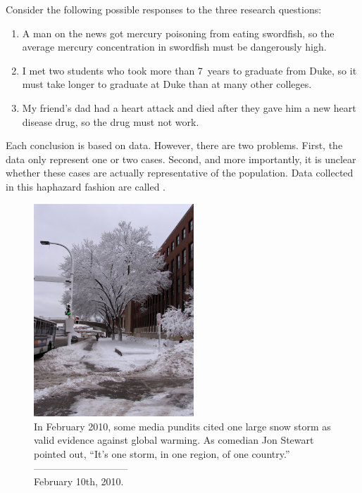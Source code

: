 Consider the following possible responses to the three research questions:
\begin{enumerate}
\item A man on the news got mercury poisoning from eating swordfish, so the average mercury concentration in swordfish must be dangerously high.
\item\label{iKnowThreeStudentsWhoTookMoreThan7YearsToGraduateAtDuke} I met two students who took more than 7~years to graduate from Duke, so it must take longer to graduate at Duke than at many other colleges.
\item\label{myFriendsDadDiedAfterSulphinpyrazon} My friend's dad had a heart attack and died after they gave him a new heart disease drug, so the drug must not work.
\end{enumerate}
Each conclusion is based on data. However, there are two problems. First, the data only represent one or two cases. Second, and more importantly, it is unclear whether these cases are actually representative of the population. Data collected in this haphazard fashion are called .

\setlength{\captionwidth}{\textwidth-80mm}
\begin{figure}
\centering
\hspace{8mm}\includegraphics[width=60mm]{ch_data_collection/figures/mnWinter/mnWinter}\hspace{4mm}
\begin{minipage}[b]{\textwidth - 80mm}
   \caption[anecdotal evidence]{In February 2010, some media pundits cited one large snow storm as valid evidence against global warming. As comedian Jon Stewart pointed out, ``It's one storm, in one region, of one country.''\vspace{-4.5mm} \\

   -----------------------------\vspace{-2mm}\\
   {\footnotesize February 10th, 2010.}
   \label{mnWinter}}
\end{minipage}
\end{figure}
\setlength{\captionwidth}{\mycaptionwidth}

